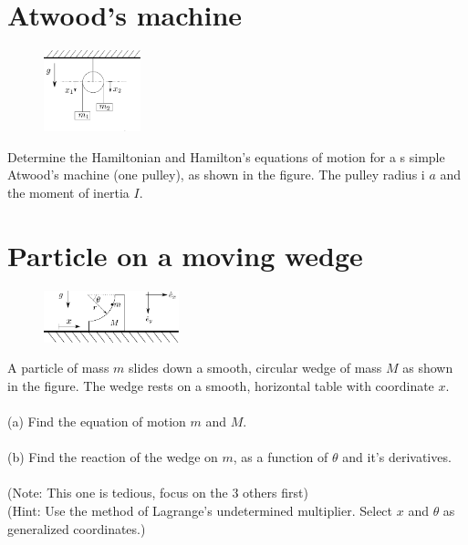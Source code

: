 \documentclass{article}
\begin{document}
    \section{Atwood's machine}
    \begin{figure}
        \vspace{-1cm}
        \includegraphics[width=0.25\textwidth]{figures/figure_3.pdf}
        \vspace{-2cm}
    \end{figure}
    Determine the Hamiltonian and Hamilton's equations of motion for a s simple Atwood's machine (one pulley), as shown in the figure. The pulley radius i $a$ and the moment of inertia $I$.
    \newpage

    \section{Particle on a moving wedge}
    \begin{figure}
        \vspace{-1cm}
        \includegraphics[width=0.35\textwidth]{figures/figure_4.pdf}
    \end{figure}
    A particle of mass $m$ slides down a smooth, circular wedge of mass $M$ as shown in the figure. The wedge rests on a smooth, horizontal table with coordinate $x$. \\ \\
    (a) Find the equation of motion $m$ and $M$. \\ \\
    (b) Find the reaction of the wedge on $m$, as a function of $\theta$ and it's derivatives. \\ \\
    (Note: This one is tedious, focus on the 3 others first) \\ 
    (Hint: Use the method of Lagrange's undetermined multiplier. Select $x$ and $\theta$ as generalized coordinates.)
\end{document}
